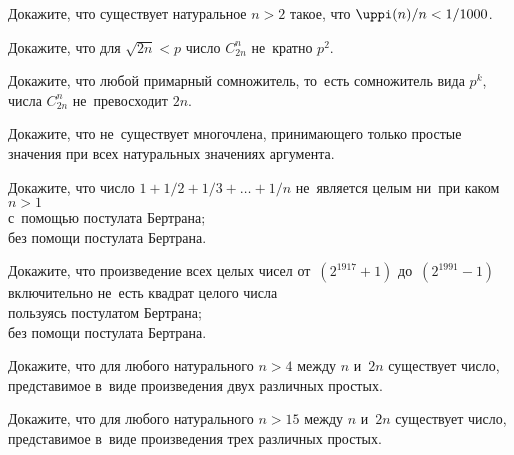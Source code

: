 \begin{problems}

\item
Докажите, что существует натуральное $n > 2$ такое, что
$\pifunc(n) / n < 1 / 1000$.

\item
Докажите, что для $\sqrt{2n} < p$ число $C_{2n}^n$ не~кратно $p^2$.

\item
Докажите, что любой примарный сомножитель, то~есть сомножитель вида $p^{k}$, 
числа $C_{2n}^{n}$ не~превосходит $2 n$.

\item
Докажите, что не~существует многочлена, принимающего только простые значения
при всех натуральных значениях аргумента.

\item
Докажите, что число $1 + 1 / 2 + 1 / 3 + \ldots + 1 / n$ не~является целым
ни~при каком $n > 1$
\\
\subproblem с~помощью постулата Бертрана; 
\\
\subproblem без помощи постулата Бертрана.

\item
Докажите, что произведение всех целых чисел от~$(2^{1917} + 1)$
до~$(2^{1991} - 1)$ включительно не~есть квадрат целого числа
\\
\subproblem пользуясь постулатом Бертрана;
\\
\subproblem без помощи постулата Бертрана.

\item
Докажите, что для любого натурального $n > 4$ между $n$ и~$2 n$ существует
число, представимое в~виде произведения двух различных простых.

\item
Докажите, что для любого натурального $n > 15$ между $n$ и~$ 2n$ существует
число, представимое в~виде произведения трех различных простых.
 
\end{problems}

\endgroup %

